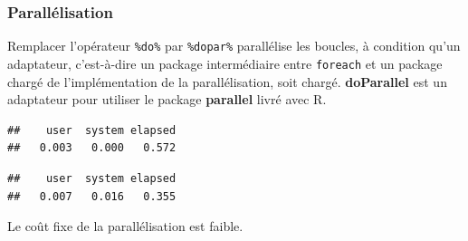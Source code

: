 \documentclass[
  12pt,
  french,
  a4paper,
  extrafontsizes,onecolumn,openright
  ]{memoir}
\newenvironment{Shaded}{\begin{snugshade}}{\end{snugshade}}
\newcommand{\CommentTok}[1]{\textcolor[rgb]{0.56,0.35,0.01}{\textit{#1}}}
\newcommand{\DataTypeTok}[1]{\textcolor[rgb]{0.13,0.29,0.53}{#1}}
\newcommand{\KeywordTok}[1]{\textcolor[rgb]{0.13,0.29,0.53}{\textbf{#1}}}
\newcommand{\NormalTok}[1]{#1}
\newcommand{\OperatorTok}[1]{\textcolor[rgb]{0.81,0.36,0.00}{\textbf{#1}}}
\newcommand{\StringTok}[1]{\textcolor[rgb]{0.31,0.60,0.02}{#1}}
\begin{document}
\hypertarget{paralluxe9lisation}{%
\subsubsection{Parallélisation}\label{paralluxe9lisation}}

Remplacer l'opérateur \texttt{\%do\%} par \texttt{\%dopar\%} parallélise les boucles, à condition qu'un adaptateur, c'est-à-dire un package intermédiaire entre \texttt{foreach} et un package chargé de l'implémentation de la parallélisation, soit chargé.
\textbf{doParallel} est un adaptateur pour utiliser le package \textbf{parallel} livré avec R.

\scriptsize

\begin{Shaded}
\end{Shaded}

\begin{verbatim}
##    user  system elapsed 
##   0.003   0.000   0.572
\end{verbatim}

\begin{Shaded}
\end{Shaded}

\begin{verbatim}
##    user  system elapsed 
##   0.007   0.016   0.355
\end{verbatim}

\normalsize

Le coût fixe de la parallélisation est faible.
\end{document}
